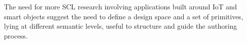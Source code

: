 The need for more SCL research involving applications built around IoT and smart objects suggest the need to define a design space and a set of primitives, lying at different semantic levels, useful to structure and guide the authoring process.





